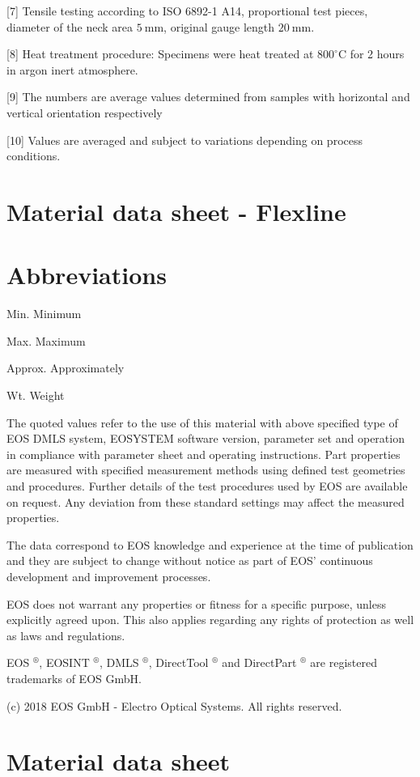 \documentclass[10pt]{article}
\begin{document}
[7] Tensile testing according to ISO 6892-1 A14, proportional test pieces, diameter of the neck area $5 \mathrm{~mm}$, original gauge length $20 \mathrm{~mm}$.

[8] Heat treatment procedure: Specimens were heat treated at $800^{\circ} \mathrm{C}$ for 2 hours in argon inert atmosphere.

[9] The numbers are average values determined from samples with horizontal and vertical orientation respectively

[10] Values are averaged and subject to variations depending on process conditions.

\section*{Material data sheet - Flexline}
\section*{Abbreviations}
Min. Minimum

Max. Maximum

Approx. Approximately

Wt. Weight

The quoted values refer to the use of this material with above specified type of EOS DMLS system, EOSYSTEM software version, parameter set and operation in compliance with parameter sheet and operating instructions. Part properties are measured with specified measurement methods using defined test geometries and procedures. Further details of the test procedures used by EOS are available on request. Any deviation from these standard settings may affect the measured properties.

The data correspond to EOS knowledge and experience at the time of publication and they are subject to change without notice as part of EOS' continuous development and improvement processes.

EOS does not warrant any properties or fitness for a specific purpose, unless explicitly agreed upon. This also applies regarding any rights of protection as well as laws and regulations.

EOS $^{\circledR}$, EOSINT $^{\circledR}$, DMLS $^{\circledR}$, DirectTool $^{\circledR}$ and DirectPart ${ }^{\circledR}$ are registered trademarks of EOS GmbH.

(c) 2018 EOS GmbH - Electro Optical Systems. All rights reserved.

\section*{Material data sheet}
\end{document}
